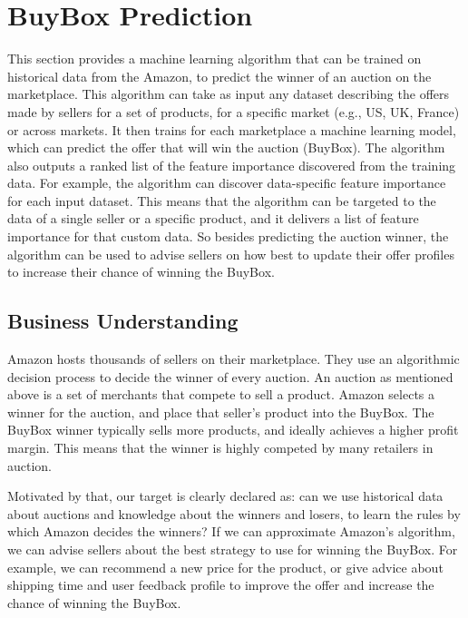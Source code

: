 \section{BuyBox Prediction}
\label{sec:buybox}
This section provides a machine learning algorithm that can be trained on historical data from the Amazon, to predict the winner of an auction on the marketplace. This algorithm can take as input any dataset describing the offers made by sellers for a set of products, for a specific market (e.g., US, UK, France) or across markets. It then trains for each marketplace a machine learning model, which can predict the offer that will win the auction (BuyBox). The algorithm also outputs a ranked list of the feature importance discovered from the training data. For example, the algorithm can discover data-specific feature importance for each input dataset. This means that the algorithm can be targeted to the data of a single seller or a specific product, and it delivers a list of feature importance for that custom data. So besides predicting the auction winner, the algorithm can be used to advise sellers on how best to update their offer profiles to increase their chance of winning the BuyBox.

\subsection{Business Understanding}
\label{sec:bbbusiness}
Amazon hosts thousands of  sellers on their marketplace. They use an algorithmic decision process to decide the winner of every auction. An auction as mentioned above is a set of merchants that compete to sell a product. Amazon selects a winner for the auction, and place that seller's product into the BuyBox. The BuyBox winner typically sells more products, and ideally achieves a higher profit margin. This means that the winner is highly competed by many retailers in auction.

Motivated by that, our target is clearly declared as: can we use historical data about auctions and knowledge about the winners and losers, to learn the rules by which Amazon decides the winners? If we can approximate Amazon’s algorithm, we can advise sellers about the best strategy to use for winning the BuyBox. For example, we can recommend a new price for the product, or give advice about shipping time and user feedback profile to improve the offer and increase the chance of winning the BuyBox. 

